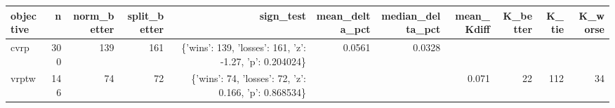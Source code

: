 \begin{tabular}{lrrrrrrrrrr}
\toprule
objective & n & norm\_better & split\_better & sign\_test & mean\_delta\_pct & median\_delta\_pct & mean\_Kdiff & K\_better & K\_tie & K\_worse \\
\midrule
cvrp & 300 & 139 & 161 & \{'wins': 139, 'losses': 161, 'z': -1.27, 'p': 0.204024\} & 0.0561 & 0.0328 &  &  &  &  \\
vrptw & 146 & 74 & 72 & \{'wins': 74, 'losses': 72, 'z': 0.166, 'p': 0.868534\} &  &  & 0.071 & 22 & 112 & 34 \\
\bottomrule
\end{tabular}
